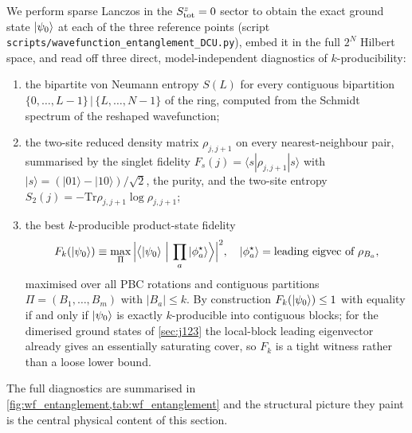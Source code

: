 \documentclass[11pt,a4paper]{article}
\renewcommand{\Tr}{\mathrm{Tr}}
\newcommand{\PsiZ}{\ket{\psi_0}}
\begin{document}
We perform sparse Lanczos in the $S^z_{\rm tot}=0$ sector to obtain
the exact ground state $\PsiZ$ at each of the three reference
points (script \texttt{scripts/wavefunction\_entanglement\_DCU.py}),
embed it in the full $2^N$ Hilbert space, and read off three
direct, model-independent diagnostics of $k$-producibility:
\begin{enumerate}[leftmargin=2em]
\item the bipartite von Neumann entropy $S(L)$ for every
contiguous bipartition $\{0,\dots,L-1\}\,|\,\{L,\dots,N-1\}$ of the
ring, computed from the Schmidt spectrum of the reshaped
wavefunction;
\item the two-site reduced density matrix $\rho_{j,j+1}$ on every
nearest-neighbour pair, summarised by the singlet fidelity
$F_s(j)=\langle s|\rho_{j,j+1}|s\rangle$ with
$|s\rangle=(|01\rangle-|10\rangle)/\sqrt2$, the purity, and the
two-site entropy $S_2(j)=-\Tr\rho_{j,j+1}\log\rho_{j,j+1}$;
\item the best $k$-producible product-state fidelity
\begin{equation}
   F_k(\PsiZ)\equiv\max_{\Pi}\,\Bigl|\bigl\langle\PsiZ\,\Big|\,
   \prod_{a}|\phi_a^\star\rangle\Bigr\rangle\Bigr|^2,\quad
   |\phi_a^\star\rangle=\text{leading eigvec of }\rho_{B_a},
   \label{eq:Fk_def}
\end{equation}
maximised over all PBC rotations and contiguous partitions
$\Pi=(B_1,\dots,B_m)$ with $|B_a|\le k$.  By construction
$F_k(\PsiZ)\le 1$ with equality if and only if $\PsiZ$ is exactly
$k$-producible into contiguous blocks; for the dimerised ground
states of \cref{sec:j123} the local-block leading eigenvector
already gives an essentially saturating cover, so $F_k$ is a tight
witness rather than a loose lower bound.
\end{enumerate}
The full diagnostics are summarised in
\cref{fig:wf_entanglement,tab:wf_entanglement} and the structural
picture they paint is the central physical content of this section.
\end{document}
